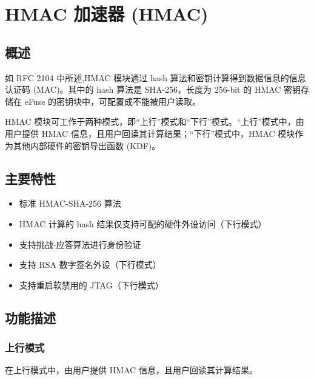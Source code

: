 \documentclass[main\_\_CN.tex]{subfiles}
\begin{document}

\ifglobal
\else
    {\let\clearpage\relax \listoftodos}
    {\let\clearpage\relax \listofdonetodos}
    \tableofcontents
\fi



\chapter{HMAC 加速器 (HMAC)}
\label{mod:hmac}
\hypertarget{hmac}{}

\section{概述}
如 RFC 2104 中所述,HMAC 模块通过 hash 算法和密钥计算得到数据信息的信息认证码 (MAC)。其中的 hash 算法是 SHA-256，长度为 256-bit 的 HMAC 密钥存储在 eFuse 的密钥块中，可配置成不能被用户读取。

HMAC 模块可工作于两种模式，即“上行”模式和“下行”模式。“上行”模式中，由用户提供 HMAC 信息，且用户回读其计算结果；“下行”模式中，HMAC 模块作为其他内部硬件的密钥导出函数 (KDF)。

\section{主要特性}
\begin{itemize}
    \item 标准 HMAC-SHA-256 算法
    \item HMAC 计算的 hash 结果仅支持可配的硬件外设访问（下行模式）
    \item 支持挑战-应答算法进行身份验证
    \item 支持 RSA 数字签名外设（下行模式）
    \item 支持重启软禁用的 JTAG（下行模式）
\end{itemize}


\section{功能描述}
\subsection{上行模式}
在上行模式中，由用户提供 HMAC 信息，且用户回读其计算结果。
\end{document}
